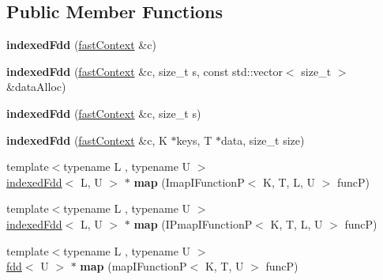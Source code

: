 \subsection*{Public Member Functions}
\begin{DoxyCompactItemize}
\item 
\hypertarget{classfaster_1_1indexedFdd_a00f525684f5c451a2824e3244b256604}{}{\bfseries indexed\+Fdd} (\hyperlink{classfaster_1_1fastContext}{fast\+Context} \&c)\label{classfaster_1_1indexedFdd_a00f525684f5c451a2824e3244b256604}

\item 
\hypertarget{classfaster_1_1indexedFdd_abe773f041ad055a201b986bf5ed2903e}{}{\bfseries indexed\+Fdd} (\hyperlink{classfaster_1_1fastContext}{fast\+Context} \&c, size\+\_\+t s, const std\+::vector$<$ size\+\_\+t $>$ \&data\+Alloc)\label{classfaster_1_1indexedFdd_abe773f041ad055a201b986bf5ed2903e}

\item 
\hypertarget{classfaster_1_1indexedFdd_a9f6dc447c25e6bf1143348cbc2fff92d}{}{\bfseries indexed\+Fdd} (\hyperlink{classfaster_1_1fastContext}{fast\+Context} \&c, size\+\_\+t s)\label{classfaster_1_1indexedFdd_a9f6dc447c25e6bf1143348cbc2fff92d}

\item 
\hypertarget{classfaster_1_1indexedFdd_a2dcdec6b27dadc929564ff3023eba569}{}{\bfseries indexed\+Fdd} (\hyperlink{classfaster_1_1fastContext}{fast\+Context} \&c, K $\ast$keys, T $\ast$data, size\+\_\+t size)\label{classfaster_1_1indexedFdd_a2dcdec6b27dadc929564ff3023eba569}

\item 
\hypertarget{classfaster_1_1indexedFdd_ae5d93ceaa1701aab3b3affc262ad3cc6}{}{\footnotesize template$<$typename L , typename U $>$ }\\\hyperlink{classfaster_1_1indexedFdd}{indexed\+Fdd}$<$ L, U $>$ $\ast$ {\bfseries map} (Imap\+I\+Function\+P$<$ K, T, L, U $>$ func\+P)\label{classfaster_1_1indexedFdd_ae5d93ceaa1701aab3b3affc262ad3cc6}

\item 
\hypertarget{classfaster_1_1indexedFdd_a419f8dacfdbeb5f4d6d48e1c7a352fd8}{}{\footnotesize template$<$typename L , typename U $>$ }\\\hyperlink{classfaster_1_1indexedFdd}{indexed\+Fdd}$<$ L, U $>$ $\ast$ {\bfseries map} (I\+Pmap\+I\+Function\+P$<$ K, T, L, U $>$ func\+P)\label{classfaster_1_1indexedFdd_a419f8dacfdbeb5f4d6d48e1c7a352fd8}

\item 
\hypertarget{classfaster_1_1indexedFdd_adb7965514a7e972cb74c10b5ce83af9c}{}{\footnotesize template$<$typename L , typename U $>$ }\\\hyperlink{classfaster_1_1fdd}{fdd}$<$ U $>$ $\ast$ {\bfseries map} (map\+I\+Function\+P$<$ K, T, U $>$ func\+P)\label{classfaster_1_1indexedFdd_adb7965514a7e972cb74c10b5ce83af9c}


\end{DoxyCompactItemize}
